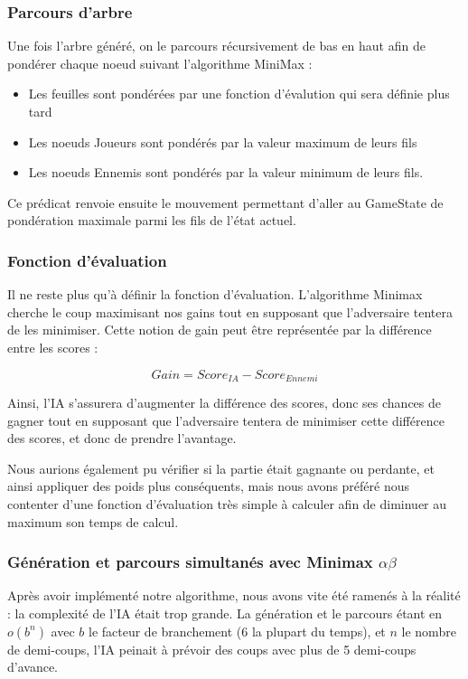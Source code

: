 \documentclass[]{article}
\begin{document}
\subsubsection{Parcours d'arbre}

Une fois l'arbre généré, on le parcours récursivement de bas en haut afin de pondérer chaque noeud suivant l'algorithme MiniMax :
\begin{itemize}
\item Les feuilles sont pondérées par une fonction d'évalution qui sera définie plus tard
\item Les noeuds Joueurs sont pondérés par la valeur maximum de leurs fils
\item Les noeuds Ennemis sont pondérés par la valeur minimum de leurs fils.
\end{itemize}

Ce prédicat renvoie ensuite le mouvement permettant d'aller au GameState de pondération maximale parmi les fils de l'état actuel.

\subsubsection{Fonction d'évaluation}

Il ne reste plus qu'à définir la fonction d'évaluation. L'algorithme Minimax cherche le coup maximisant nos gains tout en supposant que l'adversaire tentera de les minimiser. Cette notion de gain peut être représentée par la différence entre les scores : 

$$Gain = Score_{IA} - Score_{Ennemi}$$

Ainsi, l'IA s'assurera d'augmenter la différence des scores, donc ses chances de gagner tout en supposant que l'adversaire tentera de minimiser cette différence des scores, et donc de prendre l'avantage.

Nous aurions également pu vérifier si la partie était gagnante ou perdante, et ainsi appliquer des poids plus conséquents, mais nous avons préféré nous contenter d'une fonction d'évaluation très simple à calculer afin de diminuer au maximum son temps de calcul.

\subsubsection{Génération et parcours simultanés avec Minimax $\alpha\beta$}

Après avoir implémenté notre algorithme, nous avons vite été ramenés à la réalité : la complexité de l'IA était trop grande. La génération et le parcours étant en $o(b^{n})$ avec $b$ le facteur de branchement (6 la plupart du temps), et $n$ le nombre de demi-coups, l'IA peinait à prévoir des coups avec plus de 5 demi-coups d'avance.
\end{document}
